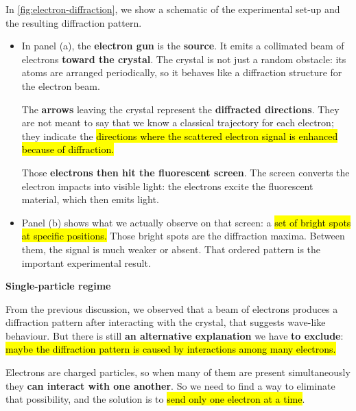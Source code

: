 \noindent
In \autoref{fig:electron-diffraction}, we show a schematic of the experimental set-up and the resulting diffraction pattern.
\begin{itemize}
    \item In panel (a), the \textbf{electron gun} is the \textbf{source}. It emits a collimated beam of electrons \textbf{toward the crystal}. The crystal is not just a random obstacle: its atoms are arranged periodically, so it behaves like a diffraction structure for the electron beam.

        \highspace
        The \textbf{arrows} leaving the crystal represent the \textbf{diffracted directions}. They are not meant to say that we know a classical trajectory for each electron; they indicate the \hl{directions where the scattered electron signal is enhanced because of diffraction.}

        \highspace
        Those \textbf{electrons then hit the fluorescent screen}. The screen converts the electron impacts into visible light: the electrons excite the fluorescent material, which then emits light.

    \item Panel (b) shows what we actually observe on that screen: a \hl{set of bright spots at specific positions.} Those bright spots are the diffraction maxima. Between them, the signal is much weaker or absent. That ordered pattern is the important experimental result.
\end{itemize}

\highspace
\begin{flushleft}
    \textcolor{Green3}{ \textbf{Single-particle regime}}
    \label{sec:single-particle-regime}
\end{flushleft}
From the previous discussion, we observed that a beam of electrons produces a diffraction pattern after interacting with the crystal, that suggests wave-like behaviour. But there is still \textbf{an alternative explanation} we have \textbf{to exclude}: \hl{maybe the diffraction pattern is caused by interactions among many electrons.}

\highspace
Electrons are charged particles, so when many of them are present simultaneously they \textbf{can interact with one another}. So we need to find a way to eliminate that possibility, and the solution is to \hl{send only one electron at a time}.

